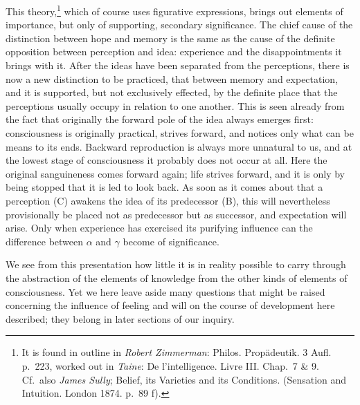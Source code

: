 \documentclass[12pt,a4paper]{book}
\newcommand{\opage}[1]{\marginnote{\footnotesize\textit{[#1]}}}
\begin{document}
This theory,\footnote{It is found in outline in \emph{Robert Zimmerman}:
Philos. Propädeutik. 3 Aufl. p.~223, worked out in \emph{Taine}: De
l'intelligence. Livre III. Chap.~7 \& 9. Cf.\ also \emph{James Sully};
Belief, its Varieties and its Conditions. (Sensation and Intuition. London
1874. p.~89 f).} which of course uses figurative expressions, brings out
elements of importance, but only of supporting, secondary significance. The
chief cause of the distinction between hope and memory is the same as the
cause of the definite opposition between perception and idea: experience
and the disappointments it brings with it. After the ideas have been
separated from the perceptions, there is now a new distinction to be
practiced, that between memory and expectation, and it is supported, but
not exclusively effected, by the definite place that the perceptions
usually occupy in relation to one another. This is seen
already from the fact that originally the
\opage{164}forward pole of the idea always emerges first: consciousness is
originally practical, strives forward, and notices only what can be means
to its ends. Backward reproduction is always more unnatural to us, and at
the lowest stage of consciousness it probably does not occur at all. Here
the original sanguineness comes forward again; life strives forward, and
it is only by being stopped that it is led to look back. As soon as it
comes about that a perception (C) awakens the idea of its predecessor
(B), this will nevertheless provisionally be placed not as predecessor but
as successor, and expectation will arise. Only when experience has
exercised its purifying influence can the difference between $\alpha$ and
$\gamma$ become of significance.

We see from this presentation how little it is in reality possible to
carry through the abstraction of the elements of knowledge from the other
kinds of elements of consciousness. Yet we here leave aside many
questions that might be raised concerning the influence of feeling and
will on the course of development here described; they belong in later
sections of our inquiry.
\end{document}
